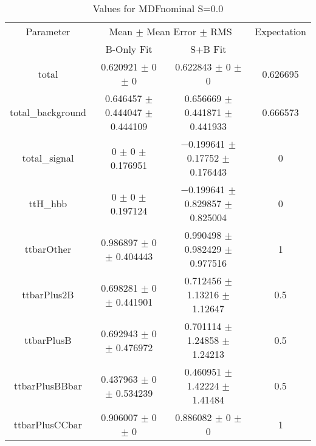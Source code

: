 \begin{table}
\centering
\caption{Values for MDFnominal S=0.0}
\begin{tabular}{cccc}
\toprule
Parameter & \multicolumn{2}{c}{Mean $\pm$ Mean Error $\pm$ RMS} & Expectation\\
 & B-Only Fit & S+B Fit & \\
\midrule
total & \num{0.620921} $\pm$ \num{0} $\pm$ \num{0} & \num{0.622843} $\pm$ \num{0} $\pm$ \num{0} & \num{0.626695}\\
total\_background & \num{0.646457} $\pm$ \num{0.444047} $\pm$ \num{0.444109} & \num{0.656669} $\pm$ \num{0.441871} $\pm$ \num{0.441933} & \num{0.666573}\\
total\_signal & \num{0} $\pm$ \num{0} $\pm$ \num{0.176951} & \num{-0.199641} $\pm$ \num{0.17752} $\pm$ \num{0.176443} & \num{0}\\
ttH\_hbb & \num{0} $\pm$ \num{0} $\pm$ \num{0.197124} & \num{-0.199641} $\pm$ \num{0.829857} $\pm$ \num{0.825004} & \num{0}\\
ttbarOther & \num{0.986897} $\pm$ \num{0} $\pm$ \num{0.404443} & \num{0.990498} $\pm$ \num{0.982429} $\pm$ \num{0.977516} & \num{1}\\
ttbarPlus2B & \num{0.698281} $\pm$ \num{0} $\pm$ \num{0.441901} & \num{0.712456} $\pm$ \num{1.13216} $\pm$ \num{1.12647} & \num{0.5}\\
ttbarPlusB & \num{0.692943} $\pm$ \num{0} $\pm$ \num{0.476972} & \num{0.701114} $\pm$ \num{1.24858} $\pm$ \num{1.24213} & \num{0.5}\\
ttbarPlusBBbar & \num{0.437963} $\pm$ \num{0} $\pm$ \num{0.534239} & \num{0.460951} $\pm$ \num{1.42224} $\pm$ \num{1.41484} & \num{0.5}\\
ttbarPlusCCbar & \num{0.906007} $\pm$ \num{0} $\pm$ \num{0} & \num{0.886082} $\pm$ \num{0} $\pm$ \num{0} & \num{1}\\
\bottomrule
\end{tabular}
\end{table}